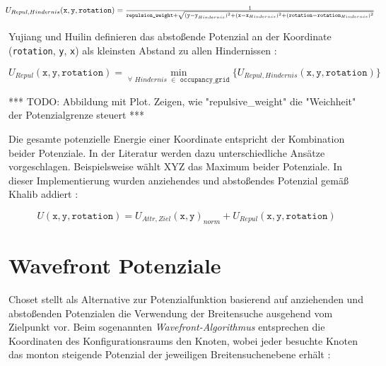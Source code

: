 \begin{equation*}
\hspace*{-0.04\linewidth}
\resizebox{1.1\linewidth}{!}{
  $ U_{Repul, Hindernis}(\texttt{x}, \texttt{y}, \texttt{rotation}) = \frac{1}{\texttt{repulsion\_weight} + \sqrt{(\texttt{y} - \texttt{y}_{Hindernis})^2 + (\texttt{x} - \texttt{x}_{Hindernis})^2 + (\texttt{rotation} - \texttt{rotation}_{Hindernis})^2}}
$ 
}
\hspace*{-0.06\linewidth}
\end{equation*}

Yujiang und Huilin definieren das abstoßende Potenzial an der Koordinate (\texttt{rotation}, \texttt{y}, \texttt{x}) als kleinsten Abstand zu allen Hindernissen \cite{yujiang.2017}:

\begin{equation*}
U_{Repul}(\texttt{x}, \texttt{y}, \texttt{rotation}) = \min_{\forall \,\,Hindernis \,\,\in \texttt{ occupancy\_grid}} \{ U_{Repul, Hindernis}(\texttt{x}, \texttt{y}, \texttt{rotation}) \}
\end{equation*}

*** TODO: Abbildung mit Plot. Zeigen, wie "repulsive\_weight" die "Weichheit" der Potenzialgrenze steuert ***

Die gesamte potenzielle Energie einer Koordinate entspricht der Kombination beider Potenziale.
In der Literatur werden dazu unterschiedliche Ansätze vorgeschlagen. Beispielsweise wählt XYZ das Maximum beider Potenziale. In dieser Implementierung wurden anziehendes und abstoßendes Potenzial gemäß Khalib addiert \cite{khatib.1985}: 

\begin{equation*}
U(\texttt{x}, \texttt{y}, \texttt{rotation}) = U_{Attr, Ziel}(\texttt{x}, \texttt{y})_{norm} + U_{Repul}(\texttt{x}, \texttt{y}, \texttt{rotation})
\end{equation*}



\section{Wavefront Potenziale}

Choset stellt als Alternative zur Potenzialfunktion basierend auf anziehenden und abstoßenden Potenzialen die Verwendung der Breitensuche ausgehend vom Zielpunkt vor. Beim sogenannten \textit{Wavefront-Algorithmus} entsprechen die Koordinaten des Konfigurationsraums den Knoten, wobei jeder besuchte Knoten das monton steigende Potenzial der jeweiligen Breitensuchenebene erhält \cite{choset.2007}:

